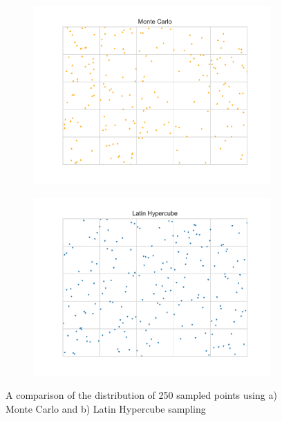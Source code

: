 \begin{figure}[H]

\begin{subfigure}{.5\textwidth}
  \centering
  \includegraphics[width=\textwidth]{fig/mc.pdf}
  \label{fig:mc}
\end{subfigure}%
\begin{subfigure}{.5\textwidth}
  \centering
  \includegraphics[width=\textwidth]{fig/lh.pdf}
  \label{fig:lh}
\end{subfigure}%

\caption{A comparison of the distribution of 250 sampled points using a) Monte Carlo and b) Latin Hypercube sampling}
\end{figure}


